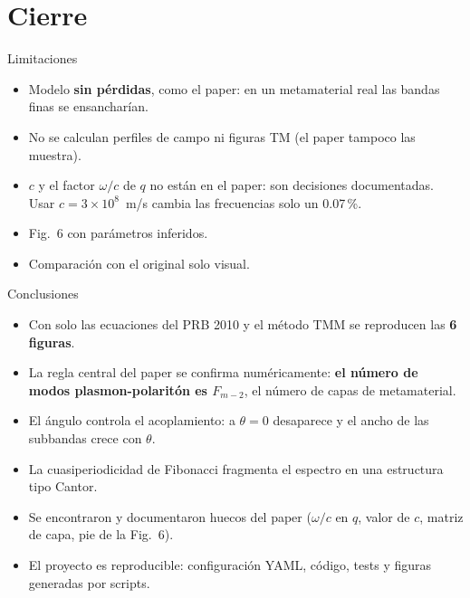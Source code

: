 \documentclass[aspectratio=169,10pt]{beamer}
\begin{document}
\section{Cierre}

\begin{frame}{Limitaciones}
  \begin{itemize}
    \item Modelo \textbf{sin pérdidas}, como el paper: en un metamaterial real las bandas finas se ensancharían.
    \item No se calculan perfiles de campo ni figuras TM (el paper tampoco las muestra).
    \item $c$ y el factor $\omega/c$ de $q$ no están en el paper: son decisiones documentadas. Usar $c=3\times10^8$~m/s cambia las frecuencias solo un 0.07\,\%.
    \item Fig.~6 con parámetros inferidos.
    \item Comparación con el original solo visual.
  \end{itemize}
\end{frame}

\begin{frame}{Conclusiones}
  \begin{itemize}
    \item Con solo las ecuaciones del PRB 2010 y el método TMM se reproducen las \textbf{6 figuras}.
    \item La regla central del paper se confirma numéricamente: \textbf{el número de modos plasmon-polaritón es $F_{m-2}$}, el número de capas de metamaterial.
    \item El ángulo controla el acoplamiento: a $\theta=0$ desaparece y el ancho de las subbandas crece con $\theta$.
    \item La cuasiperiodicidad de Fibonacci fragmenta el espectro en una estructura tipo Cantor.
    \item Se encontraron y documentaron huecos del paper ($\omega/c$ en $q$, valor de $c$, matriz de capa, pie de la Fig.~6).
    \item El proyecto es reproducible: configuración YAML, código, tests y figuras generadas por scripts.
  \end{itemize}
\end{frame}
\end{document}
